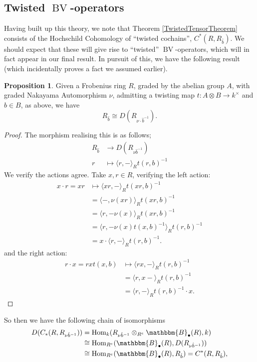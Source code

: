 \documentclass{article}
\newcommand{\homo}{\operatorname{Hom}}
\newcommand{\bv}{\operatorname{BV}}
\theoremstyle{plain}
\theoremstyle{definition}
\newtheorem{proposition}[theorem]{Proposition}
\begin{document}
\subsection{Twisted $\bv$-operators}
Having built up this theory, we note that Theorem \ref{TwistedTensorTheorem} consists of the Hochschild Cohomology of ``twisted cochains'', $C^*(R, R_{\hat{b}})$. We should expect that these will give rise to ``twisted'' $\bv$-operators, which will in fact appear in our final result. In pursuit of this, we have the following result (which incidentally proves a fact we assumed earlier).
\begin{proposition}\label{frobprop} Given a Frobenius ring $R$, graded by the abelian group $A$, with graded Nakayama Automorphism $\nu$, admitting a twisting map $t: A \otimes B \rightarrow k^\times$ and $b\in B$, as above, we have
$$R_{\hat{b}} \cong D(R_{\nu \cdot \hat{b}^{-1}}).$$

\end{proposition}
\begin{proof}
The morphism realising this is as follows; 
$$\begin{aligned} R_{\hat{b}} &\rightarrow D(R_{\nu\hat{b}^{-1}}) \\
 r &\mapsto \langle r, - \rangle_R t(r,b)^{-1} \end{aligned}$$
We verify the actions agree. Take $x,r  \in R$, verifying the left action:
$$\begin{aligned} x\cdot r = xr &\mapsto \langle xr, - \rangle_R t(xr,b)^{-1}\\
&= \langle -, \nu(xr) \rangle_R t(xr,b)^{-1}\\
&= \langle r, -\nu(x) \rangle_R t(xr,b)^{-1} \\
&= \langle r, - \nu(x)t(x, b)^{-1} \rangle_R t(r,b)^{-1} \\
&= x \cdot \langle r, - \rangle_R t(r,b)^{-1} .\end{aligned}$$
and the right action:
$$\begin{aligned} r \cdot x = rx t(x,b) &\mapsto \langle rx, - \rangle_R t(r,b)^{-1} \\
&= \langle r, x-\rangle_R t(r,b)^{-1} \\
&=  \langle r, - \rangle_R t(r,b)^{-1} \cdot x .\end{aligned}$$
\end{proof} 
So then we have the following chain of isomorphisms
$$\begin{aligned}D(C_*(R,R_{\nu\hat{b}^{-1}}))&=\homo_k(R_{\nu\hat{b}^{-1}} \otimes_{R^e} \mathbbm{B}_\bullet (R), k) \\
& \cong \homo_{R^e}( \mathbbm{B}_\bullet (R), D(R_{\nu\hat{b}^{-1}})) \\
& \cong \homo_{R^e}( \mathbbm{B}_\bullet (R), R_{\hat{b}}) = C^*(R,R_{\hat{b}}),
\end{aligned}$$
\end{document}
